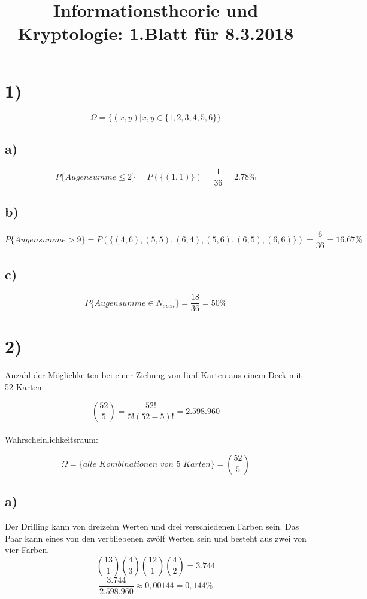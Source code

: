 %



  \title{Informationstheorie und Kryptologie: 1.Blatt für 8.3.2018}
  \maketitle

\section*{1)}
  \[ \Omega = \{(x,y) |x,y \in \{ 1,2,3,4,5,6 \} \} \]

  \subsection*{a)}
    \[ P \{ Augensumme \leq 2 \} = P(\{ (1,1)\} ) = \frac{1}{36} = 2.78 \% \]

  \subsection*{b)}
    \[ P \{ Augensumme > 9 \} = P(\{ (4,6), (5,5), (6,4), (5,6), (6,5), (6,6)\} ) = \frac{6}{36} = 16.67 \% \]

  \subsection*{c)}
    \[ P \{ Augensumme \in N_{even} \} = \frac{18}{36} = 50 \% \]

\section*{2)}
  Anzahl der Möglichkeiten bei einer Ziehung von fünf Karten aus einem Deck mit 52 Karten:

  \[ \binom{52}{5} = \frac{52!}{5!(52-5)!} = 2.598.960 \]
  \\
  Wahrscheinlichkeitsraum:

  \[ \Omega = \{ \textit{alle Kombinationen von 5 Karten} \} = \binom{52}{5} \]

  \subsection*{a)}
    Der Drilling kann von dreizehn Werten und drei verschiedenen Farben sein. Das Paar kann eines von den verbliebenen zwölf Werten sein und besteht aus zwei von vier Farben.
    \\
    \[ \binom{13}{1}\binom{4}{3}\binom{12}{1}\binom{4}{2} = 3.744 \]
    \[ \frac{3.744}{2.598.960} \approx 0,00144 = 0,144 \% \]

